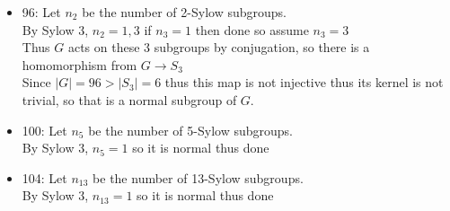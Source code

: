 \documentclass[12pt,letterpaper]{article}
\theoremstyle{definition}
\begin{document}
\begin{itemize}
    If the 3-Sylow subgroups intersect trivially then\\
    There are 10*8=80 elements in the 3-Sylow subgroups. However,
    this is not enough elements for the 6 5-Sylow subgroups since $6*4+80>90$\\
    If there exists 2 unique 3-Sylow subgroups where they don't intersect trivially.\\
    Thus let $H$ and $K$ be two unique subgroups where $H \cap K \neq \{e\}$ since $H \cap K$ is a subgroup of $H$ we know by lagrange's theorem it is size 3,9.\\
    If it is size 9 then this implies $H=K$ which is a contradiction thus $|H \cap K|=3$\\
    Proven in class since $H,K=3^2$ we know they are abelian.\\
    Thus let $e\neq x \in H \cap K$\\
    Thus $x$ is abelian in $H$ and abelian in $K$\\
    Thus $C_G(x)$ contains $H \cup K$\\
    Thus this implies $HK \subset C_G(x)$ since $C_G(x)$ is a group.\\
    Thus $|HK|=\dfrac{|H||K|}{|P \cap K|}=27$\\
    Thus $|C_G(x)|\geq 27$ and is a multiple of 9 since it has subgroup $H$ and divides 90 thus $|C_G(x)|=45,90$\\
    If $|C_G(x)|=45 \implies$ it is normal since it has index 2.\\
    If $|C_G(x)|=90 \implies x\in Z(G)$ thus the center is nontrivial thus it is a normal subgroup, and it can't be the whole group since $G$ is not abelian.
    \item 96:
    Let $n_2$ be the number of 2-Sylow subgroups.\\
    By Sylow 3, $n_2=1,3$ if $n_3=1$ then done so assume $n_3=3$\\
    Thus $G$ acts on these 3 subgroups by conjugation, so there is a homomorphism from $G \rightarrow S_3$\\
    Since $|G|=96 > |S_3|=6$ thus this map is not injective thus its kernel is not trivial, so that is a normal subgroup of $G$.
    \item 100:
    Let $n_{5}$ be the number of 5-Sylow subgroups.\\
    By Sylow 3, $n_{5}=1$ so it is normal thus done
    \item 104:
    Let $n_{13}$ be the number of 13-Sylow subgroups.\\
    By Sylow 3, $n_{13}=1$ so it is normal thus done

\end{itemize}
\end{document}
